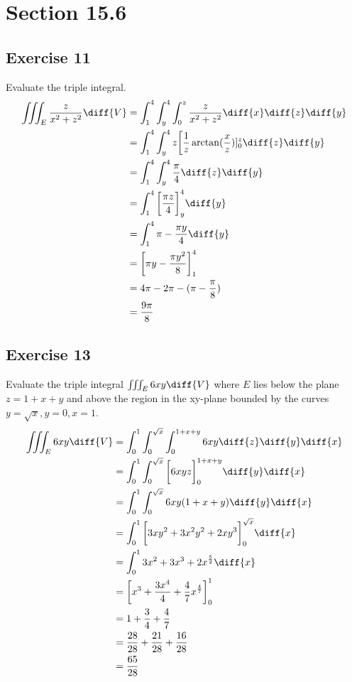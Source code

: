 \documentclass{math}
\begin{document}
\section*{Section 15.6}

\subsection*{Exercise 11}
Evaluate the triple integral.
\begin{align*}
  \iiint_{E}\frac{z}{x^2+z^2}\diff{V} &=
    \int_{1}^{4}\int_{y}^{4}\int_{0}^{z}
    \frac{z}{x^2+z^2}\diff{x}\diff{z}\diff{y} \\
  &= \int_{1}^{4}\int_{y}^{4}
    z\bigg[\frac{1}{z}\arctan(\frac{x}{z})]_{0}^{z}\diff{z}\diff{y} \\
  &= \int_{1}^{4}\int_{y}^{4}\frac{\pi}{4}\diff{z}\diff{y} \\
  &= \int_{1}^{4}\bigg[\frac{\pi z}{4}\bigg]_{y}^{4}\diff{y} \\
  &= \int_{1}^{4}\pi-\frac{\pi y}{4}\diff{y} \\
  &= \bigg[\pi y-\frac{\pi y^2}{8}\bigg]_{1}^{4} \\
  &= 4\pi-2\pi-(\pi-\frac{\pi}{8}) \\
  &= \frac{9\pi}{8}
\end{align*}

\subsection*{Exercise 13}
Evaluate the triple integral \( \iiint_{E}6xy\diff{V} \) where \( E \) lies
below the plane \( z = 1+x+y \) and above the region in the xy-plane bounded by
the curves \( y = \sqrt{x}, y = 0, x = 1 \).
\begin{align*}
  \iiint_{E}6xy\diff{V} &=
    \int_{0}^{1}\int_{0}^{\sqrt{x}}\int_{0}^{1+x+y}
    6xy\diff{z}\diff{y}\diff{x} \\
  &= \int_{0}^{1}\int_{0}^{\sqrt{x}}
    \bigg[6xyz\bigg]_{0}^{1+x+y}\diff{y}\diff{x} \\
  &= \int_{0}^{1}\int_{0}^{\sqrt{x}}6xy(1+x+y)\diff{y}\diff{x} \\
  &= \int_{0}^{1}\bigg[3xy^2+3x^2y^2+2xy^3\bigg]_{0}^{\sqrt{x}}\diff{x} \\
  &= \int_{0}^{1}3x^2+3x^3+2x^{\frac{5}{2}}\diff{x} \\
  &= \bigg[x^3+\frac{3x^4}{4}+\frac{4}{7}x^{\frac{4}{7}}\bigg]_{0}^{1} \\
  &= 1+\frac{3}{4}+\frac{4}{7} \\
  &= \frac{28}{28}+\frac{21}{28}+\frac{16}{28} \\
  &= \frac{65}{28}
\end{align*}
\end{document}
